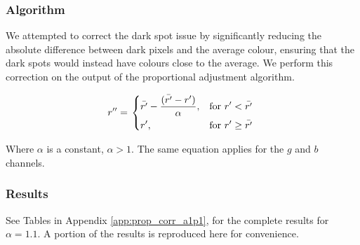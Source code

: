\subsubsection*{Algorithm}
We attempted to correct the dark spot issue by significantly reducing the absolute difference between dark pixels and the average colour, ensuring that the dark spots would instead have colours close to the average. We perform this correction on the output of the proportional adjustment algorithm.

\begin{equation} \label{eq:prop_corr_algo}
  r'' = \left.
  \begin{dcases}
    \displaystyle \bar{r'} - \frac{(\bar{r'} - r')}{\alpha}, & \text{for } r' < \bar{r'} \\
    \displaystyle r', & \text{for } r' \geq \bar{r'} \\
  \end{dcases}
  \right.\\
\end{equation}


Where $\alpha$ is a constant, $\alpha  > 1$. The same equation applies for the $g$ and $b$ channels.

\subsubsection*{Results}
See Tables in Appendix \ref{app:prop_corr_a1p1}, for the complete results for $\alpha = 1.1$. A portion of the results is reproduced here for convenience.

